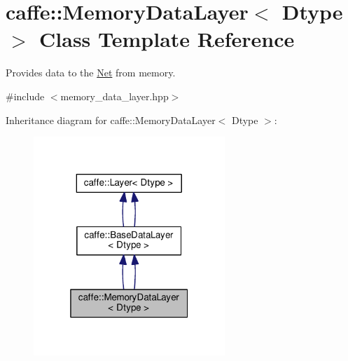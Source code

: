 \hypertarget{classcaffe_1_1_memory_data_layer}{}\section{caffe\+:\+:Memory\+Data\+Layer$<$ Dtype $>$ Class Template Reference}
\label{classcaffe_1_1_memory_data_layer}


Provides data to the \mbox{\hyperlink{classcaffe_1_1_net}{Net}} from memory.  




{\ttfamily \#include $<$memory\+\_\+data\+\_\+layer.\+hpp$>$}



Inheritance diagram for caffe\+:\+:Memory\+Data\+Layer$<$ Dtype $>$\+:
\nopagebreak
\begin{figure}[H]
\begin{center}
\leavevmode
\includegraphics[width=205pt]{classcaffe_1_1_memory_data_layer__inherit__graph}
\end{center}
\end{figure}
